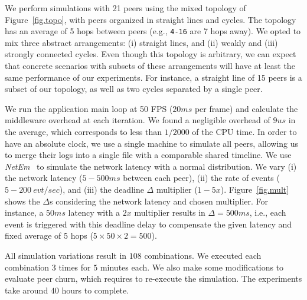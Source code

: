\documentclass[10pt,journal,compsoc]{IEEEtran}
\newcommand{\code}[1]  {\texttt{\small{#1}}}
\begin{document}
We perform simulations with 21 peers using the mixed topology of
Figure~\ref{fig.topo}, with peers organized in straight lines and cycles.
The topology has an average of 5 hops between peers (e.g., \code{4-16} are 7
hops away).
We opted to mix three abstract arrangements:
    (i) straight lines, and (ii) weakly and (iii) strongly connected cycles.
Even though this topology is arbitrary, we can expect that concrete scenarios
with subsets of these arrangements will have at least the same performance of
our experiments.
For instance, a straight line of 15 peers is a subset of our topology, as well
as two cycles separated by a single peer.

We run the application main loop at 50 FPS ($20ms$ per frame) and calculate
the middleware overhead at each iteration.
We found a negligible overhead of $9us$ in the average, which corresponds to
less than $1/2000$ of the CPU time.
%
In order to have an absolute clock, we use a single machine to simulate all
peers, allowing us to merge their logs into a single file with a comparable
shared timeline.
%
We use \emph{NetEm}~\cite{netem} to simulate the network latency with a normal
distribution.
%
We vary
    (i)   the network latency ($5-500ms$ between each peer),
    (ii)  the rate of events ($5-200~evt/sec$), and
    (iii) the deadline $\Delta$ multiplier ($1-5x$).
%
Figure~\ref{fig.mult} shows the $\Delta$s considering the network latency and
chosen multiplier.
For instance, a $50ms$ latency with a $2x$ multiplier results in
$\Delta=500ms$, i.e., each event is triggered with this deadline delay to
compensate the given latency and fixed average of 5 hops
($5 \times 50 \times 2 = 500$).

All simulation variations result in $108$ combinations.
We executed each combination $3$ times for $5$ minutes each.
We also make some modifications to evaluate peer churn, which requires to
re-execute the simulation.
The experiments take around $40$ hours to complete.

\end{document}
